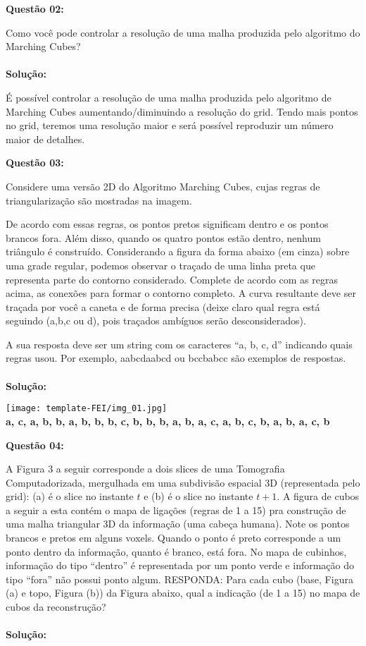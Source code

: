 \noindent\textbf{Questão 02:}

Como você pode controlar a resolução de uma malha produzida pelo algoritmo do Marching Cubes?\\
\\
\noindent\textbf{Solução:}

É possível controlar a resolução de uma malha produzida pelo algoritmo de Marching Cubes aumentando/diminuindo a resolução do grid. Tendo mais pontos no grid, teremos uma resolução maior e será possível reproduzir um número maior de detalhes.
\vspace{1cm}

\noindent\textbf{Questão 03:}

Considere uma versão 2D do Algoritmo Marching Cubes, cujas regras de triangularização são mostradas na imagem.

De acordo com essas regras, os pontos pretos significam dentro e os pontos brancos fora. Além disso, quando os quatro pontos estão dentro, nenhum triângulo é construído. Considerando a figura da forma abaixo (em cinza) sobre uma grade regular, podemos observar o traçado de uma linha preta que representa parte do contorno considerado. Complete de acordo com as regras acima, as conexões para formar o contorno completo. A curva resultante deve ser traçada por você a caneta e de forma precisa (deixe claro qual
regra está seguindo (a,b,c ou d), pois traçados ambíguos serão desconsiderados).

A sua resposta deve ser um string com os caracteres “a, b, c, d” indicando quais regras usou. Por exemplo, aabcdaabcd ou bccbabcc são exemplos de respostas.\\
\\
\noindent\textbf{Solução:}

\begin{center}
    \texttt{[image: template-FEI/img\_01.jpg]}\\
    \textbf{a, c, a, b, b, a, b, b, b, c, b, b, b, a, b, a, c, a, b, c, b, a, b, a, c, b}
\end{center}
\vspace{0.5cm}

\noindent\textbf{Questão 04:}

A Figura 3 a seguir corresponde a dois slices de uma Tomografia
Computadorizada, mergulhada em uma subdivisão espacial 3D (representada pelo grid): (a) é o slice no instante $t$ e (b) é o slice no instante $t + 1$. A figura de cubos a seguir a esta contém o mapa de ligações (regras de 1 a 15) pra construção de uma malha triangular 3D da informação (uma cabeça humana). Note os pontos brancos e pretos em alguns voxels. Quando o ponto é preto corresponde a um ponto dentro da informação, quanto é branco, está fora. No mapa de cubinhos, informação do tipo “dentro” é representada por um ponto verde e informação do tipo “fora” não possui ponto algum. RESPONDA: Para cada cubo (base, Figura (a) e topo, Figura (b)) da Figura abaixo, qual a indicação (de 1 a 15) no mapa de cubos da reconstrução?\\
\\
\noindent\textbf{Solução:}

